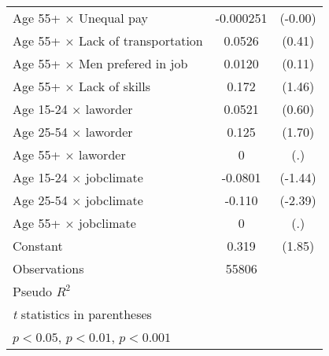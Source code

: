 {\begin{longtable}{l*{1}{cc}}
Age 55+ $\times$ Unequal pay&   -0.000251         &     (-0.00)\\
Age 55+ $\times$ Lack of transportation&      0.0526         &      (0.41)\\
Age 55+ $\times$ Men prefered in job&      0.0120         &      (0.11)\\
Age 55+ $\times$ Lack of skills&       0.172         &      (1.46)\\
Age 15-24 $\times$ laworder&      0.0521         &      (0.60)\\
Age 25-54 $\times$ laworder&       0.125         &      (1.70)\\
Age 55+ $\times$ laworder&           0         &         (.)\\
Age 15-24 $\times$ jobclimate&     -0.0801         &     (-1.44)\\
Age 25-54 $\times$ jobclimate&      -0.110\sym{*}  &     (-2.39)\\
Age 55+ $\times$ jobclimate&           0         &         (.)\\
Constant            &       0.319         &      (1.85)\\
\hline
Observations        &       55806         &            \\
Pseudo \(R^{2}\)    &                     &            \\
\hline\hline
\multicolumn{3}{l}{\footnotesize \textit{t} statistics in parentheses}\\
\multicolumn{3}{l}{\footnotesize \sym{*} \(p<0.05\), \sym{**} \(p<0.01\), \sym{***} \(p<0.001\)}\\
\end{longtable}
}
